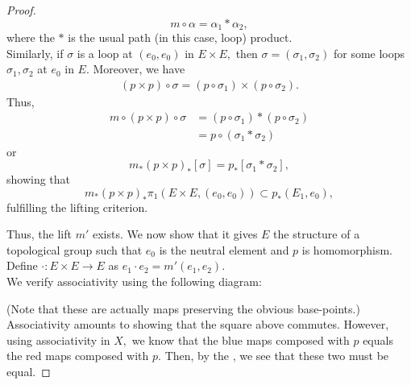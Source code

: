 \documentclass[12pt]{article}
\begin{document}
\begin{proof}
\begin{equation*}
		m\circ\alpha = \alpha_1*\alpha_2,
	\end{equation*}
	where the $*$ is the usual path (in this case, loop) product.\\
	Similarly, if $\sigma$ is a loop at $(e_0, e_0)$ in $E \times E,$ then $\sigma = (\sigma_1, \sigma_2)$ for some loops $\sigma_1, \sigma_2$ at $e_0$ in $E.$ Moreover, we have
	\begin{align*} 
		(p\times p)\circ\sigma = (p \circ \sigma_1)\times(p \circ \sigma_2).
	\end{align*}
	Thus,
	\begin{align*} 
		m\circ(p \times p) \circ \sigma &= (p \circ \sigma_1)*(p \circ \sigma_2)\\
		&= p \circ (\sigma_1 * \sigma_2)
	\end{align*}
	or
	\begin{equation*} 
		m_*(p\times p)_*[\sigma] = p_*[\sigma_1 * \sigma_2],	
	\end{equation*}
	showing that
	\begin{equation*} 
		m_*(p \times p)_*\pi_1(E\times E, (e_0, e_0)) \subset p_*(E_1, e_0),
	\end{equation*}
	fulfilling the lifting criterion.

	Thus, the lift $m'$ exists. We now show that it gives $E$ the structure of a topological group such that $e_0$ is the neutral element and $p$ is homomorphism.\\
	Define $\cdot:E\times E \to E$ as $e_1\cdot e_2 = m'(e_1, e_2).$\\
	We verify associativity using the following diagram:

	\begin{center}
	\end{center}

	(Note that these are actually maps preserving the obvious base-points.)\\
	Associativity amounts to showing that the square above commutes. However, using associativity in $X,$ we know that the blue maps composed with $p$ equals the red maps composed with $p.$ Then, by the , we see that these two must be equal.


\end{proof}
\end{document}
